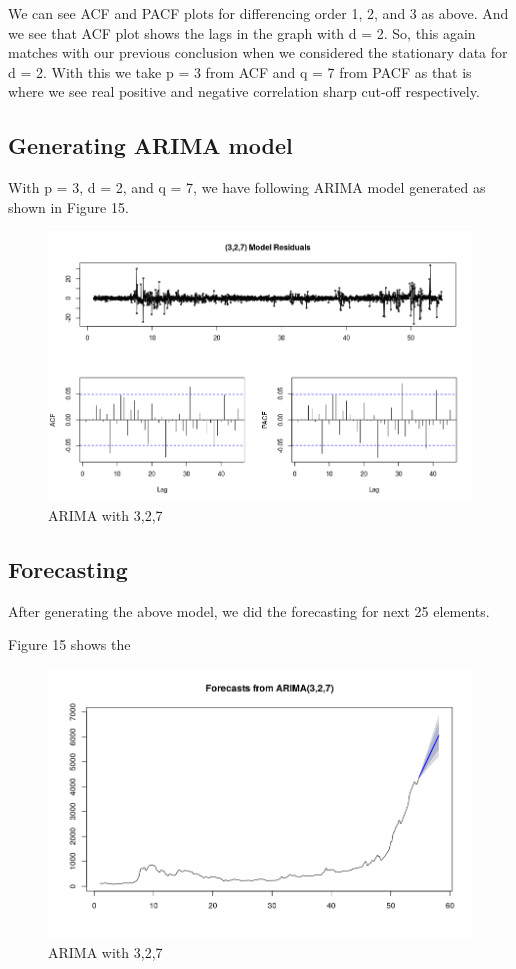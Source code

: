 \documentclass{article}
\begin{document}
We can see ACF and PACF plots for differencing order 1, 2, and 3 as above. And we see that ACF plot shows the lags in the graph with d = 2.
So, this again matches with our previous conclusion when we considered the stationary data for d = 2.
With this we take p = 3 from ACF and q = 7 from PACF as that is where we see real positive and negative correlation sharp cut-off respectively.

\subsection{Generating ARIMA model}
With p = 3, d = 2, and q = 7, we have following ARIMA model generated as shown in Figure 15.

\begin{figure}[ht]
	\centering
	\includegraphics[scale=0.25]{images/ts_images/ARIMAWith327.png}
	\caption{ARIMA with 3,2,7}
	\label{fig: ARIMA with (3,2,7)}
\end{figure}

\subsection{Forecasting}

After generating the above model, we did the forecasting for next 25 elements.

Figure 15 shows the 

\begin{figure}[ht]
	\centering
	\includegraphics[scale=0.25]{images/ts_images/ForecastWith327.png}
	\caption{ARIMA with 3,2,7}
	\label{fig: Forecast with ARIMA(3,2,7)}
\end{figure}
\end{document}
